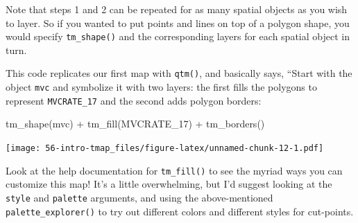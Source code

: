 \documentclass[
]{book}
\newenvironment{Shaded}{\begin{snugshade}}{\end{snugshade}}
\newcommand{\FunctionTok}[1]{\textcolor[rgb]{0.00,0.00,0.00}{#1}}
\newcommand{\NormalTok}[1]{#1}
\newcommand{\SpecialCharTok}[1]{\textcolor[rgb]{0.00,0.00,0.00}{#1}}
\newcommand{\StringTok}[1]{\textcolor[rgb]{0.31,0.60,0.02}{#1}}
\begin{document}
Note that steps 1 and 2 can be repeated for as many spatial objects as you wish to layer. So if you wanted to put points and lines on top of a polygon shape, you would specify \texttt{tm\_shape()} and the corresponding layers for each spatial object in turn.

This code replicates our first map with \texttt{qtm()}, and basically says, ``Start with the object \texttt{mvc} and symbolize it with two layers: the first fills the polygons to represent \texttt{MVCRATE\_17} and the second adds polygon borders:

\begin{Shaded}
\begin{Highlighting}[]
\FunctionTok{tm\_shape}\NormalTok{(mvc) }\SpecialCharTok{+}
  \FunctionTok{tm\_fill}\NormalTok{(}\StringTok{\textquotesingle{}MVCRATE\_17\textquotesingle{}}\NormalTok{) }\SpecialCharTok{+}
  \FunctionTok{tm\_borders}\NormalTok{()}
\end{Highlighting}
\end{Shaded}

\texttt{[image: 56-intro-tmap\_files/figure-latex/unnamed-chunk-12-1.pdf]}

Look at the help documentation for \texttt{tm\_fill()} to see the myriad ways you can customize this map! It's a little overwhelming, but I'd suggest looking at the \texttt{style} and \texttt{palette} arguments, and using the above-mentioned \texttt{palette\_explorer()} to try out different colors and different styles for cut-points.
\end{document}
